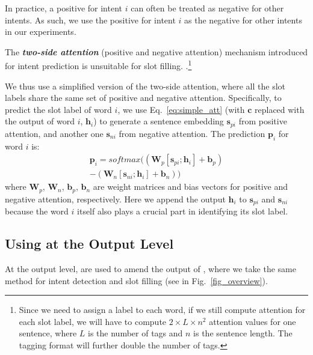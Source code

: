 In practice, a positive \RE for intent $i$ can often be treated as negative \REs for other intents. As such, we use the positive \REs for
intent $i$ as the negative \REs for other intents in our experiments.

The \textbf{\emph{two-side attention}} (positive and negative attention) mechanism introduced for intent prediction is unsuitable for slot
filling. .\footnote{Since we need to assign a label to each word, if we still compute
attention for each slot label, we will have to compute $2\times L \times n^2$ attention values for one sentence, where $L$ is the number of
tags and $n$ is the sentence length. The \BIO tagging format will further double the number of tags.}

We thus use a simplified version of the two-side attention, where all the slot labels share the same set of positive and negative attention.
Specifically, to predict the slot label of word $i$, we use Eq.~\ref{eq:simple_att} (with $\textbf{c}$ replaced with the \BLSTM output of word $i$, $\textbf{h}_i$) to generate a sentence embedding $\textbf{s}_{pi}$ from positive attention, and another one $\textbf{s}_{ni}$ from negative attention.
The prediction $\textbf{p}_i$ for word $i$ is:
\begin{equation}
\begin{split}
\textbf{p}_i = softmax((\textbf{W}_p [\textbf{s}_{pi}; \textbf{h}_i] + \textbf{b}_p) \\- (\textbf{W}_n [\textbf{s}_{ni}; \textbf{h}_i] + \textbf{b}_n))
\end{split}
\end{equation}
where $\textbf{W}_{p}$, $\textbf{W}_{n}$, $\textbf{b}_{p}$, $\textbf{b}_{n}$ are weight matrices and bias vectors for positive and negative attention, respectively. Here we append the \BLSTM output $\textbf{h}_i$ to $\textbf{s}_{pi}$ and $\textbf{s}_{ni}$ because the word $i$ itself also plays a crucial part in identifying its slot label.

\subsection{Using \REs at the Output Level}
\label{fusion_with_output} At the output level, \REs are used to amend the output of \NNs, where we take the same method for intent
detection and slot filling (see  in Fig.~\ref{fig_overview}).

